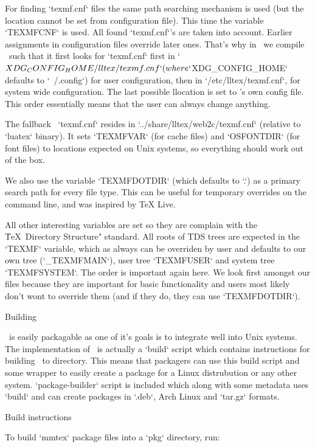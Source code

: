 For finding `texmf.cnf` files the same path searching mechanism is used (but
the location cannot be set from configuration file). This time the variable
`TEXMFCNF` is used. All found `texmf.cnf`'s are taken into account. Earlier
assignments in configuration files override later ones. That's why in \MMTeX\
we compile \LuaTeX\ such that it first looks for `texmf.cnf` first in
`$XDG_CONFIG_HOME/lltex/texmf.cnf` (where `$XDG_CONFIG_HOME` defaults to
`~/.config`) for user configuration, then in `/etc/lltex/texmf.cnf`, for system
wide configuration. The last possible llocation is set to \MMTeX's own config
file. This order essentially means that the user can always change anything.

The fallback \MMTeX\ `texmf.cnf` resides in `../share/lltex/web2c/texmf.cnf`
(relative to `luatex` binary). It sets `TEXMFVAR` (for cache files) and
`OSFONTDIR` (for font files) to locations expected on Unix systems, so
everything should work out of the box.

We also use the variable `TEXMFDOTDIR` (which defaults to `.`) as a primary
search path for every file type. This can be useful for temporary overrides on
the command line, and was inspired by TeX Live.

All other interesting variables are set so they are complain with the \"\TeX\
Directory Structure" standard. All roots of TDS trees are expected in the
`TEXMF` variable, which as always can be overriden by user and defaults to our
own tree (`_TEXMFMAIN`), user tree `TEXMFUSER` and system tree `TEXMFSYSTEM`.
The order is important again here. We look first amongst our files because they
are important for basic functionality and users most likely don't wont to
override them (and if they do, they can use `TEXMFDOTDIR`).

\sec Building \MMTeX

\MMTeX\ is easily packagable as one of it's goals is to integrate well into
Unix systems. The implementation of \MMTeX\ is actually a `build` script which
contains instructions for building \MMTeX\ to directory. This means that
packagers can use this build script and some wrapper to easily create a package
for a Linux distrubution or any other system. `package-builder` script is
included which along with some metadata uses `build` and can create packages in
`.deb`, Arch Linux and `tar.gz` formats.

\secc[build] Build instructions

To build `mmtex` package files into a `pkg` directory, run:

